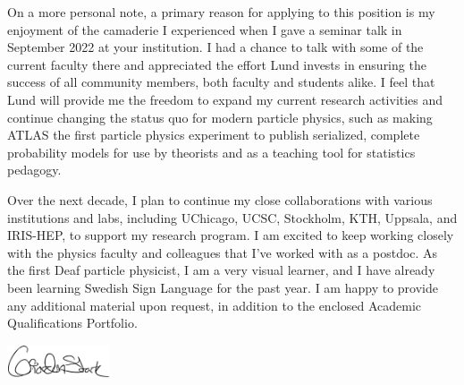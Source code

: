 On a more personal note, a primary reason for applying to this position is my enjoyment of the camaderie I experienced when I gave a seminar talk in September 2022 at your institution. I had a chance to talk with some of the current faculty there and appreciated the effort Lund invests in ensuring the success of all community members, both faculty and students alike. I feel that Lund will provide me the freedom to expand my current research activities and continue changing the status quo for modern particle physics, such as making ATLAS the first particle physics experiment to publish serialized, complete probability models for use by theorists and as a teaching tool for statistics pedagogy.

Over the next decade, I plan to continue my close collaborations with various institutions and labs, including UChicago, UCSC, Stockholm, KTH, Uppsala, and IRIS-HEP, to support my research program. I am excited to keep working closely with the physics faculty and colleagues that I've worked with as a postdoc. As the first Deaf particle physicist, I am a very visual learner, and I have already been learning Swedish Sign Language for the past year. I am happy to provide any additional material upon request, in addition to the enclosed Academic Qualifications Portfolio.

\includegraphics[height=1cm]{attachments/signature}
\vfill%

